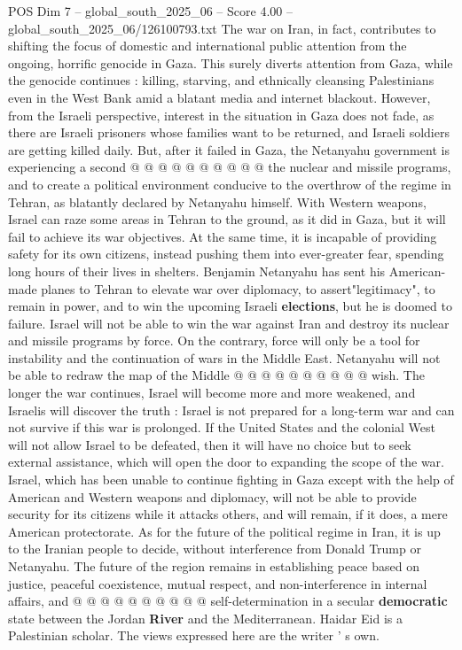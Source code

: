 \begin{textsample}{POS Dim 7 – global\_south\_2025\_06 – Score 4.00 – global\_south\_2025\_06/126100793.txt}
The war on Iran, in fact, contributes to shifting the focus of domestic and international public attention from the ongoing, horrific genocide in Gaza.
This surely diverts attention from Gaza, while the genocide continues : killing, starving, and ethnically cleansing Palestinians even in the West Bank amid a blatant media and internet blackout.
However, from the Israeli perspective, interest in the situation in Gaza does not fade, as there are Israeli prisoners whose families want to be returned, and Israeli soldiers are getting killed daily.
But, after it failed in Gaza, the Netanyahu government is experiencing a second @ @ @ @ @ @ @ @ @ @ the nuclear and missile programs, and to create a political environment conducive to the overthrow of the regime in Tehran, as blatantly declared by Netanyahu himself.
With Western weapons, Israel can raze some areas in Tehran to the ground, as it did in Gaza, but it will fail to achieve its war objectives.
At the same time, it is incapable of providing safety for its own citizens, instead pushing them into ever-greater fear, spending long hours of their lives in shelters.
Benjamin Netanyahu has sent his American-made planes to Tehran to elevate war over diplomacy, to assert"legitimacy", to remain in power, and to win the upcoming Israeli \textbf{elections}, but he is doomed to failure.
Israel will not be able to win the war against Iran and destroy its nuclear and missile programs by force.
On the contrary, force will only be a tool for instability and the continuation of wars in the Middle East.
Netanyahu will not be able to redraw the map of the Middle @ @ @ @ @ @ @ @ @ @ wish.
The longer the war continues, Israel will become more and more weakened, and Israelis will discover the truth : Israel is not prepared for a long-term war and can not survive if this war is prolonged.
If the United States and the colonial West will not allow Israel to be defeated, then it will have no choice but to seek external assistance, which will open the door to expanding the scope of the war.
Israel, which has been unable to continue fighting in Gaza except with the help of American and Western weapons and diplomacy, will not be able to provide security for its citizens while it attacks others, and will remain, if it does, a mere American protectorate.
As for the future of the political regime in Iran, it is up to the Iranian people to decide, without interference from Donald Trump or Netanyahu.
The future of the region remains in establishing peace based on justice, peaceful coexistence, mutual respect, and non-interference in internal affairs, and @ @ @ @ @ @ @ @ @ @ self-determination in a secular \textbf{democratic} state between the Jordan \textbf{River} and the Mediterranean.
Haidar Eid is a Palestinian scholar.
The views expressed here are the writer ' s own.

\end{textsample}
